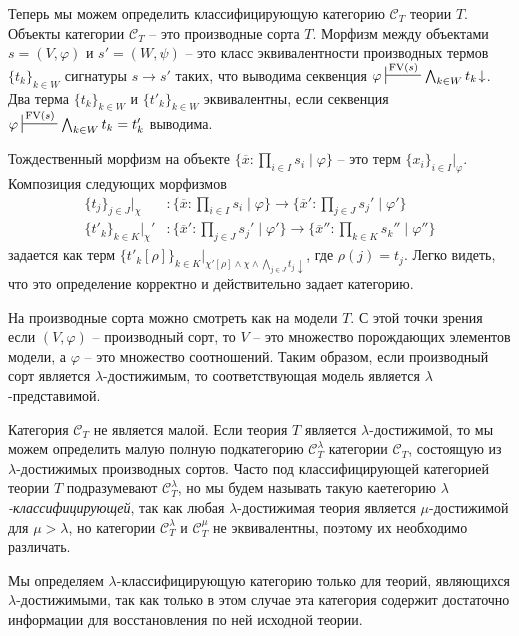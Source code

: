 \documentclass[reqno]{amsart}
\theoremstyle{definition}
\theoremstyle{remark}
\newcommand{\cat}[1]{\mathcal{#1}}
\newcommand{\fs}[1]{\mathrm{#1}}
\newcommand{\FV}{\fs{FV}}
\begin{document}
Теперь мы можем определить классифицирующую категорию $\cat{C}_T$ теории $T$.
Объекты категории $\cat{C}_T$ -- это производные сорта $T$.
Морфизм между объектами $s = (V,\varphi)$ и $s' = (W,\psi)$ -- это класс эквивалентности производных термов $\{ t_k \}_{k \in W}$ сигнатуры $s \to s'$ таких,
что выводима секвенция $\varphi \sststile{}{\FV(s)} \bigwedge_{k \in W} t_k\!\downarrow$.
Два терма $\{ t_k \}_{k \in W}$ и $\{ t'_k \}_{k \in W}$ эквивалентны, если секвенция $\varphi \sststile{}{\FV(s)} \bigwedge_{k \in W} t_k = t'_k$ выводима.

Тождественный морфизм на объекте $\{ \overline{x} : \prod_{i \in I} s_i \mid \varphi \}$ -- это терм $\{ x_i \}_{i \in I}|_\varphi$.
Композиция следующих морфизмов
\begin{align*}
\{ t_j \}_{j \in J}|_\chi & : \{ \overline{x} : \prod_{i \in I} s_i \mid \varphi \} \to \{ \overline{x}' : \prod_{j \in J} s_j' \mid \varphi' \} \\
\{ t'_k \}_{k \in K}|_\chi' & : \{ \overline{x}' : \prod_{j \in J} s_j' \mid \varphi' \} \to \{ \overline{x}'' : \prod_{k \in K} s_k'' \mid \varphi'' \}
\end{align*}
задается как терм $\{ t'_k[\rho] \}_{k \in K}|_{\chi'[\rho] \land \chi \land \bigwedge_{j \in J} t_j \downarrow}$, где $\rho(j) = t_j$.
Легко видеть, что это определение корректно и действительно задает категорию.

\begin{remark}
На производные сорта можно смотреть как на модели $T$.
С этой точки зрения если $(V,\varphi)$ -- производный сорт, то $V$ -- это множество порождающих элементов модели, а $\varphi$ -- это множество соотношений.
Таким образом, если производный сорт является $\lambda$-достижимым, то соответствующая модель является $\lambda$-представимой.
\end{remark}

Категория $\cat{C}_T$ не является малой.
Если теория $T$ является $\lambda$-достижимой, то мы можем определить малую полную подкатегорию $\cat{C}_T^\lambda$ категории $\cat{C}_T$, состоящую из $\lambda$-достижимых производных сортов.
Часто под классифицирующей категорией теории $T$ подразумевают $\cat{C}_T^\lambda$, но мы будем называть такую каетегорию \emph{$\lambda$-классифицирующей},
так как любая $\lambda$-достижимая теория является $\mu$-достижимой для $\mu > \lambda$, но категории $\cat{C}_T^\lambda$ и $\cat{C}_T^\mu$ не эквивалентны, поэтому их необходимо различать.

\begin{remark}
Мы определяем $\lambda$-классифицирующую категорию только для теорий, являющихся $\lambda$-достижимыми,
так как только в этом случае эта категория содержит достаточно информации для восстановления по ней исходной теории.
\end{remark}
\end{document}

